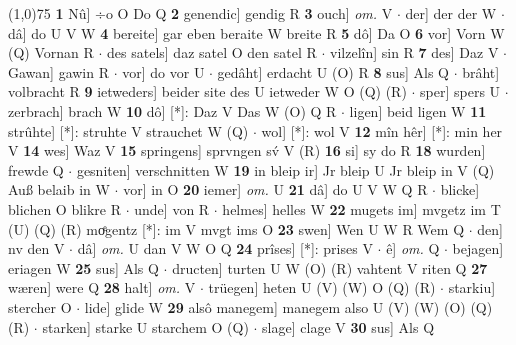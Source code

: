 \documentclass[8pt,a4paper,notitlepage]{article}
\begin{document}
\begin{table}[ht]
\begin{minipage}[t]{0.5\linewidth}
\line(1,0){75} \newline
\textbf{1} Nû] ÷o O Do Q \textbf{2} genendic] gendig R \textbf{3} ouch] \textit{om.} V  $\cdot$ der] der der W  $\cdot$ dâ] do U V W \textbf{4} bereite] gar eben beraite W breite R \textbf{5} dô] Da O \textbf{6} vor] Vorn W (Q) Vornan R  $\cdot$ des satels] daz satel O den satel R  $\cdot$ vilzelîn] sin R \textbf{7} des] Daz V  $\cdot$ Gawan] gawin R  $\cdot$ vor] do vor U  $\cdot$ gedâht] erdacht U (O) R \textbf{8} sus] Als Q  $\cdot$ brâht] volbracht R \textbf{9} ietweders] beider site des U ietweder W O (Q) (R)  $\cdot$ sper] spers U  $\cdot$ zerbrach] brach W \textbf{10} dô] [*]: Daz V Das W (O) Q R  $\cdot$ ligen] beid ligen W \textbf{11} strûhte] [*]: struhte V strauchet W (Q)  $\cdot$ wol] [*]: wol V \textbf{12} mîn hêr] [*]: min her V \textbf{14} wes] Waz V \textbf{15} springens] sprvngen sv́ V (R) \textbf{16} si] sy do R \textbf{18} wurden] frewde Q  $\cdot$ gesniten] verschnitten W \textbf{19} in bleip ir] Jr bleip U Jr bleip in V (Q) Auß belaib in W  $\cdot$ vor] in O \textbf{20} iemer] \textit{om.} U \textbf{21} dâ] do U V W Q R  $\cdot$ blicke] blichen O blikre R  $\cdot$ unde] von R  $\cdot$ helmes] helles W \textbf{22} mugets im] mvgetz im T (U) (Q) (R) moͤgentz [*]: im  V mvgt ims O \textbf{23} swen] Wen U W R Wem Q  $\cdot$ den] nv den V  $\cdot$ dâ] \textit{om.} U dan V W O Q \textbf{24} prîses] [*]: prises V  $\cdot$ ê] \textit{om.} Q  $\cdot$ bejagen] eriagen W \textbf{25} sus] Als Q  $\cdot$ dructen] turten U W (O) (R) vahtent V riten Q \textbf{27} wæren] were Q \textbf{28} halt] \textit{om.} V  $\cdot$ trüegen] heten U (V) (W) O (Q) (R)  $\cdot$ starkiu] stercher O  $\cdot$ lide] glide W \textbf{29} alsô manegem] manegem also U (V) (W) (O) (Q) (R)  $\cdot$ starken] starke U starchem O (Q)  $\cdot$ slage] clage V \textbf{30} sus] Als Q \newline
\end{minipage}
\end{table}
\end{document}
